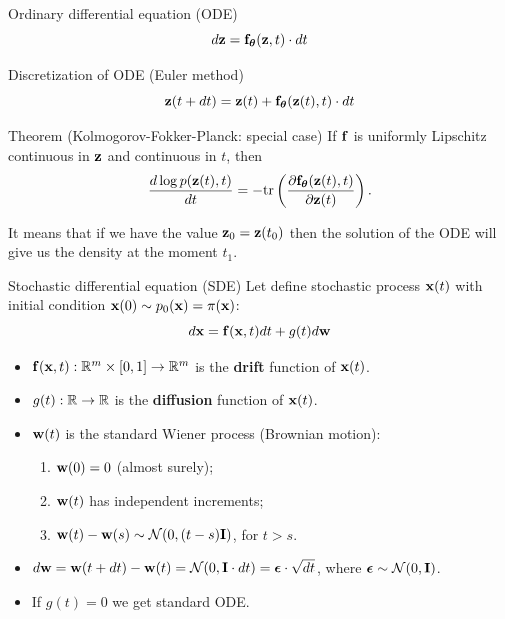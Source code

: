 \begin{frame}{Ordinary differential equation (ODE)}
	\[
 			d \mathbf{z} = \mathbf{f}_{\boldsymbol{\theta}}(\mathbf{z}, t) \cdot dt
	\]
	\vspace{-0.5cm}
	\begin{block}{Discretization of ODE (Euler method)}
		\vspace{-0.3cm}
		\[
			\mathbf{z}(t + dt) = \mathbf{z}(t) + \mathbf{f}_{\boldsymbol{\theta}}(\mathbf{z}(t), t) \cdot dt
		\]
		\vspace{-0.5cm}
	\end{block}
	\begin{block}{Theorem (Kolmogorov-Fokker-Planck: special case)}
		If $\mathbf{f}$ is uniformly Lipschitz continuous in $\mathbf{z}$ and continuous in $t$, then
		\[
			\frac{d \log p(\mathbf{z}(t), t)}{d t} = - \text{tr} \left( \frac{\partial \mathbf{f}_{\boldsymbol{\theta}}(\mathbf{z}(t), t)}{\partial \mathbf{z}(t)} \right).
		\]
	\end{block}
	It means that if we have the value $\mathbf{z}_0 = \mathbf{z}(t_0)$ then the solution of the ODE will give us the density at the moment $t_1$.
\end{frame}
\begin{frame}{Stochastic differential equation (SDE)}
	Let define stochastic process $\mathbf{x}(t)$ with initial condition $\mathbf{x}(0) \sim p_0(\mathbf{x}) = \pi(\mathbf{x})$:
	\[
		d\mathbf{x} = \mathbf{f}(\mathbf{x}, t) dt + g(t) d \mathbf{w}
	\]
	\vspace{-0.5cm}
	\begin{itemize}
		 \item $\mathbf{f}(\mathbf{x}, t): \mathbb{R}^m \times [0, 1] \rightarrow \mathbb{R}^m$ is the \textbf{drift} function of $\mathbf{x}(t)$.
		 \item $g(t): \mathbb{R} \rightarrow \mathbb{R}$ is the \textbf{diffusion} function of $\mathbf{x}(t)$.
		 \item $\mathbf{w}(t)$ is the standard Wiener process (Brownian motion):
		 \begin{enumerate}
		 	\item $\mathbf{w}(0) = 0$ (almost surely);
		 	\item $\mathbf{w}(t)$ has independent increments;
			 \item $\mathbf{w}(t) - \mathbf{w}(s) \sim \mathcal{N}(0, (t - s) \mathbf{I})$, for $t > s$.
		 \end{enumerate}
		 \item $d \mathbf{w} = \mathbf{w}(t + dt) - \mathbf{w}(t) = \mathcal{N}(0, \mathbf{I} \cdot dt ) = \boldsymbol{\epsilon} \cdot \sqrt{dt}$, where $\boldsymbol{\epsilon} \sim \mathcal{N}(0, \mathbf{I})$.
		 \item If $g(t) = 0$ we get standard ODE.
	\end{itemize}
\end{frame}
